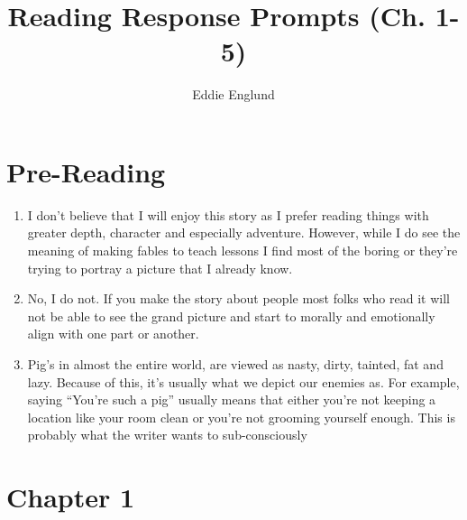 \documentclass[12pt]{article}
\title{Reading Response Prompts (Ch. 1-5)}
\author{Eddie Englund}
\begin{document}
    
    \maketitle

    \section{Pre-Reading}

    \begin{enumerate}
        \item I don't believe that I will enjoy this story as I prefer reading things with greater depth, character and especially adventure. However, while I do see the meaning of making fables to teach lessons I find most of the boring or they're trying to portray a picture that I already know.
        \item No, I do not. If you make the story about people most folks who read it will not be able to see the grand picture and start to morally and emotionally align with one part or another.
        \item Pig's in almost the entire world, are viewed as nasty, dirty, tainted, fat and lazy. Because of this, it's usually what we depict our enemies as. For example, saying ``You're such a pig'' usually means that either you're not keeping a location like your room clean or you're not grooming yourself enough. This is probably what the writer wants to sub-consciously
    \end{enumerate}

    \section{Chapter 1}
\end{document}
